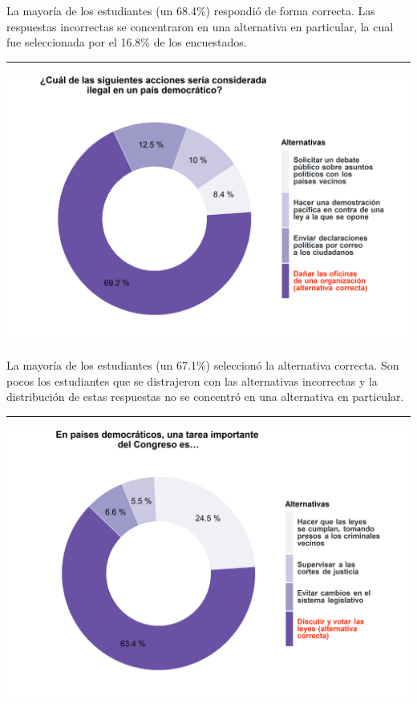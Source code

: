 \documentclass[
  14pt,
]{book}
\let\origfigure\figure
\let\endorigfigure\endfigure
\renewenvironment{figure}[1][2] {
  \expandafter\origfigure\expandafter[H]
} {
  \endorigfigure
}
\begin{document}
La mayoría de los estudiantes (un 68.4\%) respondió de forma correcta. Las respuestas incorrectas se concentraron en una alternativa en particular, la cual fue seleccionada por el 16.8\% de los encuestados.

\begin{center}\rule{0.5\linewidth}{0.5pt}\end{center}

\begin{figure}[!ht]

{\centering \includegraphics[width=0.8\linewidth,]{images/ccivico_3} 

}

\caption{Acción ilegal en un país democrático}\label{fig:unnamed-chunk-7}
\end{figure}

La mayoría de los estudiantes (un 67.1\%) seleccionó la alternativa correcta. Son pocos los estudiantes que se distrajeron con las alternativas incorrectas y la distribución de estas respuestas no se concentró en una alternativa en particular.

\begin{center}\rule{0.5\linewidth}{0.5pt}\end{center}

\begin{figure}[!ht]

{\centering \includegraphics[width=0.8\linewidth,]{images/ccivico_4} 

}

\caption{Actividad principal del Congreso}\label{fig:unnamed-chunk-8}
\end{figure}
\end{document}
